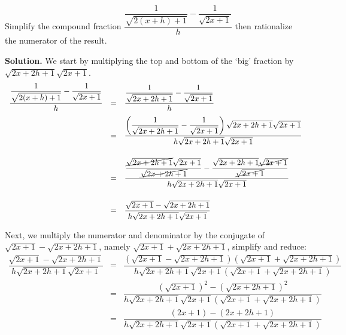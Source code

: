 \documentclass{ximera}
\begin{document}
\begin{example} \label{rationalizenumdenombosslevel}

Simplify the compound fraction $\dfrac{\dfrac{1}{\sqrt{2(x+h)+1}} - \dfrac{1}{\sqrt{2x+1}}}{h}$ then rationalize the numerator of the result.

\medskip

{\bf Solution.} We start by multiplying the top and bottom of the `big' fraction by $\sqrt{2x+2h+1} \sqrt{2x+1}$.  \[ \begin{array}{rcl}

\dfrac{\dfrac{1}{\sqrt{2(x+h)+1}} - \dfrac{1}{\sqrt{2x+1}}}{h} & = & \dfrac{\dfrac{1}{\sqrt{2x+2h+1}} - \dfrac{1}{\sqrt{2x+1}}}{h}\\[10pt]

                                                               & = & \dfrac{\left(\dfrac{1}{\sqrt{2x+2h+1}} - \dfrac{1}{\sqrt{2x+1}}\right) \sqrt{2x+2h+1} \sqrt{2x+1}}{h\sqrt{2x+2h+1} \sqrt{2x+1}}\\[22pt]
																															
																															& = & \dfrac{\dfrac{\cancel{\sqrt{2x+2h+1}}\sqrt{2x+1}}{\cancel{\sqrt{2x+2h+1}}} - \dfrac{\sqrt{2x+2h+1} \cancel{\sqrt{2x+1}}}{\cancel{\sqrt{2x+1}}}}{h\sqrt{2x+2h+1} \sqrt{2x+1}}\\[22pt]
																																			
																															& = & \dfrac{\sqrt{2x + 1}- \sqrt{2x+2h+1}}{h\sqrt{2x+2h+1} \sqrt{2x+1}}\\	
																															\end{array}\]
																															
Next, we multiply the numerator and denominator by the conjugate of $\sqrt{2x+1} - \sqrt{2x+2h+1}$, namely $\sqrt{2x+1} + \sqrt{2x+2h+1}$, simplify and reduce:\[\begin{array}{rcl}

 \dfrac{\sqrt{2x + 1}- \sqrt{2x+2h+1}}{h\sqrt{2x+2h+1} \sqrt{2x+1}} & = & \dfrac{(\sqrt{2x+1} - \sqrt{2x+2h+1})(\sqrt{2x+1} + \sqrt{2x+2h+1})}{h\sqrt{2x+2h+1} \sqrt{2x+1}(\sqrt{2x+1} + \sqrt{2x+2h+1})} \\ [20pt]

 & = & \dfrac{(\sqrt{2x+1})^2 - (\sqrt{2x+2h+1})^2}{h\sqrt{2x+2h+1} \sqrt{2x+1}(\sqrt{2x+1} + \sqrt{2x+2h+1})} \\[20pt]

 & = & \dfrac{(2x+1) - (2x+2h+1)}{h\sqrt{2x+2h+1} \sqrt{2x+1}(\sqrt{2x+1} + \sqrt{2x+2h+1})} \\[20pt]


\end{array}\]
\end{example}
\end{document}
